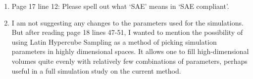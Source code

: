 \documentclass[10pt]{article}
\newcommand{\brmadd}[1]{{\color{blue}{#1}}}
\begin{document}
\begin{flushleft}
\begin{enumerate}
\medskip
\item{Page 17 line 12: Please spell out what `SAE' means in `SAE compliant'.}\\
\brmadd{Done.} 

\medskip
\item{I am not suggesting any changes to the parameters used for the simulations. But after reading page 18 lines 47-51, I wanted to mention the possibility of using Latin Hypercube Sampling as a method of picking simulation parameters in highly dimensional spaces. It allows one to fill high-dimensional volumes quite evenly with relatively few combinations of parameters, perhaps useful in a full simulation study on the current method.}\\
\brmadd{This is another nice suggestion.  We are exploring a variant of LHS (based on orthogonal sampling) to help delineate and parse parameter space explored by a few of our ongoing simulation studies.} 



\end{enumerate}
\end{flushleft}
\end{document}
